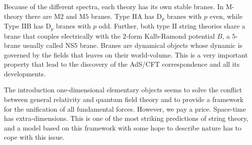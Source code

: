 \documentclass[draft]{phd}
\begin{document}
			Because of the different spectra, each theory  has its  own  stable branes. In M-theory  there are  M$2$ and M$5$ branes.
Type IIA has $\mathrm{D}_p$ branes with $p$ even, while  Type IIB has $\mathrm{D}_p$ branes with $p$ odd.
Further, both type II string theories share a brane that couples electrically with the $2$-form Kalb-Ramond potential $B$, 
a $5$-brane usually called NS$5$ brane.
Branes are dynamical objects whose dynamic is governed by the fields that leaves on their world-volume. This is a very important property that lead to
the discovery of the AdS/CFT correspondence and all its developments.

			
%

%
%		
		
		The introduction one-dimensional elementary objects seems to solve the conflict between general relativity and quantum field theory and to provide a framework for the unification of all fundamental forces.
		However, we pay a price. Space-time has extra-dimensions.
		This is one of the most striking predictions of string theory, and a model based on this framework with some hope to describe nature has to cope with this issue.
		
\end{document}
